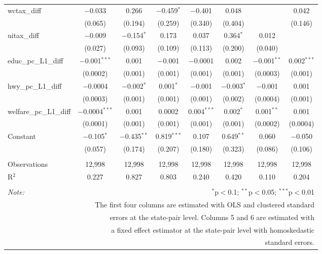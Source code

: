\begin{table}[!htbp]
\begin{tabular}{@{\extracolsep{5pt}}lccccccc}
  wctax\_diff & $-$0.033 & 0.266 & $-$0.459$^{*}$ & $-$0.401 & 0.048 &  & 0.042 \\ 
  & (0.065) & (0.194) & (0.259) & (0.340) & (0.404) &  & (0.146) \\ 
  uitax\_diff & $-$0.009 & $-$0.154$^{*}$ & 0.173 & 0.037 & 0.364$^{*}$ & 0.012 &  \\ 
  & (0.027) & (0.093) & (0.109) & (0.113) & (0.200) & (0.040) &  \\ 
  educ\_pc\_L1\_diff & $-$0.001$^{***}$ & 0.001 & $-$0.001 & $-$0.0001 & 0.002 & $-$0.001$^{**}$ & 0.002$^{***}$ \\ 
  & (0.0002) & (0.001) & (0.001) & (0.001) & (0.001) & (0.0003) & (0.001) \\ 
  hwy\_pc\_L1\_diff & $-$0.0004 & $-$0.002$^{*}$ & 0.001$^{*}$ & $-$0.001 & $-$0.003$^{*}$ & $-$0.001 & 0.001 \\ 
  & (0.0003) & (0.001) & (0.001) & (0.001) & (0.002) & (0.0004) & (0.001) \\ 
  welfare\_pc\_L1\_diff & $-$0.0004$^{***}$ & 0.001 & 0.0002 & 0.004$^{***}$ & 0.002$^{*}$ & 0.001$^{**}$ & 0.001 \\ 
  & (0.0001) & (0.001) & (0.001) & (0.001) & (0.001) & (0.0002) & (0.0004) \\ 
  Constant & $-$0.105$^{*}$ & $-$0.435$^{**}$ & 0.819$^{***}$ & 0.107 & 0.649$^{**}$ & 0.060 & $-$0.050 \\ 
  & (0.057) & (0.174) & (0.207) & (0.180) & (0.323) & (0.086) & (0.106) \\ 
 \hline \\[-1.8ex] 
Observations & 12,998 & 12,998 & 12,998 & 12,998 & 12,998 & 12,998 & 12,998 \\ 
R$^{2}$ & 0.227 & 0.827 & 0.803 & 0.240 & 0.420 & 0.110 & 0.204 \\ 
\hline 
\hline \\[-1.8ex] 
\textit{Note:}  & \multicolumn{7}{r}{$^{*}$p$<$0.1; $^{**}$p$<$0.05; $^{***}$p$<$0.01} \\ 
 & \multicolumn{7}{r}{The first four columns are estimated with OLS and clustered standard} \\ 
 & \multicolumn{7}{r}{ errors at the state-pair level. Columns 5 and 6 are estimated with} \\ 
 & \multicolumn{7}{r}{a fixed effect estimator at the state-pair level with homoskedastic} \\ 
 & \multicolumn{7}{r}{standard errors.} \\ 
\end{tabular} 
\end{table} 
